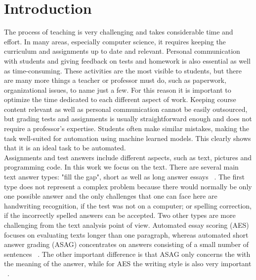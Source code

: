 
\chapter{Introduction}

The process of teaching is very challenging and takes considerable time and effort. In many areas, especially computer science, it requires keeping the curriculum and assignments up to date and relevant. Personal communication with students and giving feedback on tests and homework is also essential as well as time-consuming. These activities are the most visible to students, but there are many more things a teacher or professor must do, such as paperwork, organizational issues, to name just a few. For this reason it is important to optimize the time dedicated to each different aspect of work. Keeping course content relevant as well as personal communication cannot be easily outsourced, but grading tests and assignments is usually straightforward enough and does not require a professor's expertise. Students often make similar mistakes, making the task well-suited for automation using machine learned models. This clearly shows that it is an ideal task to be automated.\\

Assignments and test answers include different aspects, such as text, pictures and programming code. In this work we focus on the text. There are several main text answer types: "fill the gap", short as well as long answer essays ~\cite{Hasanah}. The first type does not represent a complex problem because there would normally be only one possible answer and the only challenges that one can face here are handwriting recognition, if the test was not on a computer; or spelling correction, if the incorrectly spelled answers can be accepted. Two other types are more challenging from the text analysis point of view. Automated essay scoring (AES) focuses on evaluating texts longer than one paragraph, whereas automated short answer grading (ASAG) concentrates on answers consisting of a small number of sentences ~\cite{Hasanah}. The other important difference is that ASAG only concerns the with the meaning of the answer, while for AES the writing style is also very important ~\cite{Burrows}. \\

